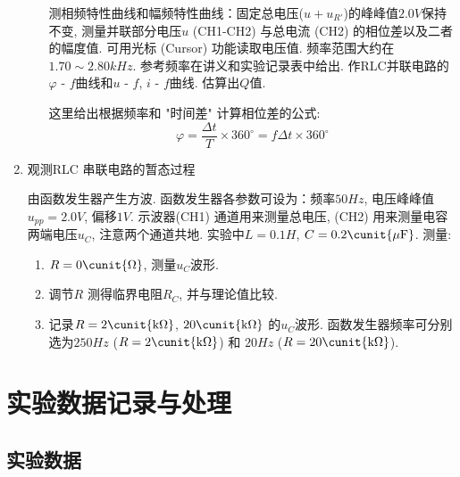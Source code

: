 \documentclass[11pt]{article}
\begin{document}
\begin{enumerate}
\begin{enumerate}
    测相频特性曲线和幅频特性曲线：固定总电压($u+u_{R'}$)的峰峰值$2.0\unit{V}$保持不变, 测量并联部分电压$u$ (CH1-CH2) 与总电流 (CH2) 的相位差以及二者的幅度值. 可用光标 (Cursor) 功能读取电压值. 频率范围大约在$1.70 \sim 2.80 \unit{kHz}$. 参考频率在讲义和实验记录表中给出. 作RLC并联电路的$\varphi \mbox{ - } f$曲线和$u \mbox{ - } f$, $i \mbox{ - } f$曲线. 估算出$Q$值. 
    
    这里给出根据频率和 "时间差" 计算相位差的公式:
    \[
        \varphi = \frac{\Delta t}{T} \times 360^\circ = f \Delta t \times 360^\circ
    \]
    
    \end{enumerate}
    
\item 观测RLC 串联电路的暂态过程
    
由函数发生器产生方波. 函数发生器各参数可设为：频率$50 \unit{Hz}$, 电压峰峰值$u_{pp} = 2.0 \unit{V}$, 偏移$1\unit{V}$. 示波器(CH1) 通道用来测量总电压, (CH2) 用来测量电容两端电压$u_C$, 注意两个通道共地. 实验中$L=0.1 \unit{H}$, $C=0.2 \cunit{\mu\mathrm{F}}$. 测量:
    
\begin{enumerate}
    
    \item $R=0 \cunit{\Omega}$, 测量$u_C$波形. 
        
    \item 调节$R$ 测得临界电阻$R_C$, 并与理论值比较. 
        
    \item 记录$R=2 \cunit{\mathrm{k}\Omega}$, $20 \cunit{\mathrm{k}\Omega}$ 的$u_C$波形. 函数发生器频率可分别选为$250 \unit{Hz}$ ($R=2 \cunit{\mathrm{k}\Omega}$) 和 $20 \unit{Hz}$ ($R=20 \cunit{\mathrm{k}\Omega}$). 
    
    \end{enumerate}
    
\end{enumerate}

\section{实验数据记录与处理}

\subsection{实验数据}
\end{document}

